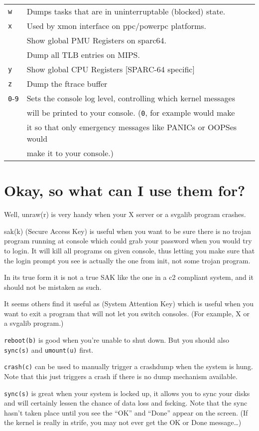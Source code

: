 \documentclass[article,letterpaper]{memoir}
\let\subsection\section
\let\section\chapter
\begin{document}
\begin{longtable}[]{@{}ll@{}}
\texttt{w} & Dumps tasks that are in uninterruptable (blocked)
state.\tabularnewline
\texttt{x} & Used by xmon interface on ppc/powerpc
platforms.\tabularnewline
& Show global PMU Registers on sparc64.\tabularnewline
& Dump all TLB entries on MIPS.\tabularnewline
\texttt{y} & Show global CPU Registers {[}SPARC-64
specific{]}\tabularnewline
\texttt{z} & Dump the ftrace buffer\tabularnewline
\texttt{0}-\texttt{9} & Sets the console log level, controlling which
kernel messages\tabularnewline
& will be printed to your console. (\texttt{0}, for example would
make\tabularnewline
& it so that only emergency messages like PANICs or OOPSes
would\tabularnewline
& make it to your console.)\tabularnewline
\bottomrule
\end{longtable}

\subsection{Okay, so what can I use them
for?}\label{okay-so-what-can-i-use-them-for}

Well, unraw(r) is very handy when your X server or a svgalib program
crashes.

sak(k) (Secure Access Key) is useful when you want to be sure there is
no trojan program running at console which could grab your password when
you would try to login. It will kill all programs on given console, thus
letting you make sure that the login prompt you see is actually the one
from init, not some trojan program.

In its true form it is not a true SAK like the one in a c2 compliant
system, and it should not be mistaken as such.

It seems others find it useful as (System Attention Key) which is useful
when you want to exit a program that will not let you switch consoles.
(For example, X or a svgalib program.)

\texttt{reboot(b)} is good when you're unable to shut down. But you
should also \texttt{sync(s)} and \texttt{umount(u)} first.

\texttt{crash(c)} can be used to manually trigger a crashdump when the
system is hung. Note that this just triggers a crash if there is no dump
mechanism available.

\texttt{sync(s)} is great when your system is locked up, it allows you
to sync your disks and will certainly lessen the chance of data loss and
fscking. Note that the sync hasn't taken place until you see the ``OK''
and ``Done'' appear on the screen. (If the kernel is really in strife,
you may not ever get the OK or Done message\ldots{})
\end{document}
